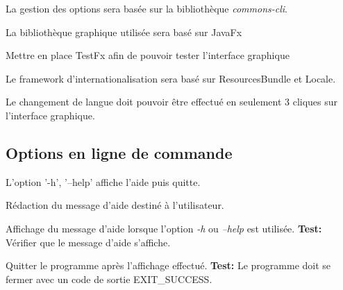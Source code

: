 \documentclass{article}
\begin{document}
\begin{nonfunctionnalneedbox}
    La gestion des options sera basée sur la bibliothèque \textit{commons-cli}.
\end{nonfunctionnalneedbox}

\begin{nonfunctionnalneedbox}
    La bibliothèque graphique utilisée sera basé sur JavaFx
    \begin{subneedbox}
        Mettre en place TestFx afin de pouvoir tester l'interface graphique
    \end{subneedbox}
\end{nonfunctionnalneedbox}

\begin{nonfunctionnalneedbox}[F13: Internationalisation]
    Le framework d'internationalisation sera basé sur ResourcesBundle et Locale.
    \begin{subneedbox}
        Le changement de langue doit pouvoir être effectué en seulement 3 cliques
        sur l'interface graphique.
    \end{subneedbox}
\end{nonfunctionnalneedbox}

\subsection{Options en ligne de commande}

\begin{needbox}
    L'option '-h', '--help' affiche l'aide puis quitte.
    \begin{subneedbox}[F16.1: Texte]
        Rédaction du message d'aide destiné à l'utilisateur.
    \end{subneedbox}
    \begin{subneedbox}[F16.2: Affichage]
        Affichage du message d'aide lorsque l'option \textit{-h} ou \textit{--help} est utilisée.
        \textbf{Test:} Vérifier que le message d'aide s'affiche.
    \end{subneedbox}
    \begin{subneedbox}[F16.3: Quitter]
        Quitter le programme après l'affichage effectué.
        \textbf{Test:} Le programme doit se fermer avec un code de sortie EXIT\_SUCCESS.
    \end{subneedbox}
\end{needbox}
\end{document}
